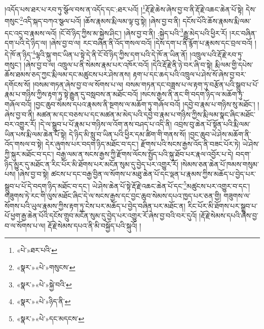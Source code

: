 །འདོད་པས་ཐར་པ་རབ་ཏུ་སྩོལ་བས་ན་འདོད་དང་:ཐར་པའོ། །\footnote{«པེ་»ཐར་པའི་}རྡོ་རྗེ་ཆེས་ཞེས་བྱ་བ་ནི་རྡོ་རྗེ་འཆང་ཆེན་པོ་སྟེ། དེས་གསུང་\footnote{«སྣར་»«པེ་»གསུངས་}འདི་སྐད་བཀའ་སྩལ་པའོ། །ཆོས་རྣམས་རྨི་ལམ་ལྟ་བུ་སྟེ། །ཞེས་བྱ་བ་ནི། དངོས་པོའི་ཆོས་རྣམས་རྨི་ལམ་དང་འདྲ་བ་རྣམས་ལའོ། །ངོ་བོ་ཉིད་ཀྱིས་མ་སྐྱེས་ཤིང་། །ཞེས་བྱ་བ་ནི། :སྐྱེད་པའི་\footnote{«སྣར་»«པེ་»སྐྱེ་བའི་}རྒྱུ་མེད་པའི་ཕྱིར་རོ། །རང་བཞིན་དག་པའི་དེ་ཉིད་ལ། །ཞེས་བྱ་བ་ལ། རང་བཞིན་ནི་འོད་གསལ་བའོ། །དེས་དག་པ་ནི་རྙོག་པ་རྣམས་དང་བྲལ་བའོ། །དེ་ཁོ་ན་ཉིད་\footnote{«སྣར་»«པེ་»ཉིད་ནི་}ལྷའི་སྐུ་གང་ཡིན་པ་སྟེ་དེ་ནི་ངོ་བོ་ཉིད་ཀྱིས་དག་པའི་དེ་ཁོ་ན་ཡིན་ནོ། །འཁྲུལ་པའི་རྡོ་རྗེ་རབ་ཏུ་གསུང་། །ཞེས་བྱ་བ་ལ། འཁྲུལ་པ་ནི་སེམས་རྣམ་པར་འཁོར་བའོ། །དེའི་རྡོ་རྗེ་ནི་ཉེ་བར་ཞི་བ་སྟེ། རྨི་ལམ་གྱི་དཔེས་ཆོས་ཐམས་ཅད་ཀྱང་རྨི་ལམ་དང་མཚུངས་པར་ཤེས་ནས། རྟག་པ་དང་ཆད་པའི་འཁྲུལ་པ་ཤེས་སོ་ཞེས་བྱ་བར་དགོངས་སོ། །བསམ་གཏན་ཞེས་བྱ་བ་ལ་སོགས་པ་ལ། བསམ་གཏན་དང་བཟླས་པ་ལ་རྟག་ཏུ་བརྩོན་པའི་སྒྲུབ་པ་པོ་རྣམ་པ་གཉིས་ཀྱིས་རྟག་ཏུ་སྟེ་རྒྱུན་དུ་བསླབས་ན་མཐོང་བའོ། །སངས་རྒྱས་ནི་ནང་གི་བདག་ཉིད་ལ་མཆོག་ཏུ་གཞོལ་བའོ། །བྱང་ཆུབ་སེམས་དཔའ་རྣམས་ནི་སྔགས་ལ་མཆོག་ཏུ་གཞོལ་བའོ། །དབྱེ་བ་རྣམ་པ་གཉིས་སུ་མཐོང་། །ཞེས་བྱ་བ་ནི། མཚན་མ་དང་བཅས་པ་དང་མཚན་མ་མེད་པའི་དབྱེ་བ་རྣམ་པ་གཉིས་ཀྱིས་རྨི་ལམ་སྣང་ཞིང་མཐོང་བར་འགྱུར་རོ། །དེ་ལ་སྒྲུབ་པ་པོ་རྣམ་པ་གཉིས་ལ་འོག་ནས་བཤད་པ་འདི་ནི། འབྲས་བུ་ཆེན་པོ་སྟོན་པའི་རྨི་ལམ་ཡིན་པས་རྨི་ལམ་ཆེན་པོ་སྟེ། དེ་ཉིད་མི་སླུ་བ་ཡིན་པའི་ཕྱིར་དམ་ཚིག་གི་གནས་སོ། །བྱང་ཆུབ་ཡེ་ཤེས་མཆོག་ནི་འོད་གསལ་བ་སྟེ། དེར་ཞུགས་པར་བདག་ཉིད་མཐོང་བ་དང་། རྫོགས་པའི་སངས་རྒྱས་འོད་ནི་བཟང་པོར་ཏེ། ཡེ་ཤེས་ཀྱི་སྐུར་མཐོང་བ་དང་། བརྒྱ་ལམ་ན་སངས་རྒྱས་ཀྱི་རྫོགས་ལོངས་སྤྱོད་པའི་སྐུ་ཐོབ་པར་རྣལ་འབྱོར་པ་དེ། བདག་ཉིད་མྱུར་དུ་མཐོང་ན་རིང་པོར་མི་ཐོགས་པར་མངོན་སུམ་དུ་བྱེད་པར་འགྱུར་རོ། །སེམས་ཅན་ཆེན་པོ་ཁམས་གསུམ་པས། །ཞེས་བྱ་བ་སྟེ། ཚངས་པ་དང་བརྒྱ་བྱིན་ལ་སོགས་པ་མཐུ་ཆེན་པོ་དང་ལྡན་པ་རྣམས་ཀྱིས་མཆོད་པ་བྱེད་པར་སྒྲུབ་པ་པོ་དེ་བདག་ཉིད་མཐོང་བ་དང་། ཡེ་ཤེས་ཆེན་པོ་སྟེ་རྡོ་རྗེ་འཆང་ཆེན་པོ་དང་\footnote{«སྣར་»«པེ་»དང་མདངས་}མཚུངས་པར་འགྱུར་བ་དང་། གཟུགས་ཏེ་རང་གི་ལུས་མཐོང་ཞིང་དེ་ལ་སངས་རྒྱས་དང་བྱང་ཆུབ་སེམས་དཔའ་ཁྱད་པར་ཅན་གྱི། གཟུགས་ལ་སོགས་པའི་ཡུལ་རྣམས་ཀྱིས་རྟག་ཏུ་ངེས་པར་མཆོད་པ་བྱེད་བཞིན་པར་མཐོང་ན། རིང་པོར་མི་ཐོགས་པར་སྒྲུབ་པ་པོ་ཕྱག་རྒྱ་ཆེན་པོའི་དངོས་གྲུབ་མངོན་སུམ་དུ་བྱེད་པར་འགྱུར་རོ་ཞེས་བྱ་བའི་བར་དུའོ། །རྡོ་རྗེ་སེམས་དཔའི་ཞེས་བྱ་བ་ལ་སོགས་པ་ལ། རྡོ་རྗེ་སེམས་དཔའ་ནི་མི་བསྐྱོད་པའི་སྐུའོ། །
